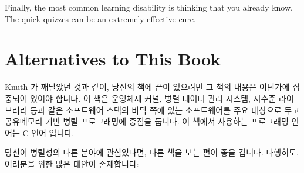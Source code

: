 Finally, the most common learning disability is thinking that
you already know.
The quick quizzes can be an extremely effective cure.
\fi

\section{Alternatives to This Book}
\label{sec:Alternatives to This Book}

Knuth 가 깨달았던 것과 같이, 당신의 책에 끝이 있으려면 그 책의 내용은 어딘가에
집중되어 있어야 합니다.
이 책은 운영체제 커널, 병렬 데이터 관리 시스템, 저수준 라이브러리 등과 같은
소프트웨어 스택의 바닥 쪽에 있는 소프트웨어를 주요 대상으로 두고 공유메모리
기반 병렬 프로그래밍에 중점을 둡니다.
이 책에서 사용하는 프로그래밍 언어는 C 언어 입니다.
\iffalse

As Knuth learned, if you want your book to be finite, it must be focused.
This book focuses on shared-memory parallel programming, with an
emphasis on software that lives near the bottom of the software stack,
such as operating-system kernels, parallel data-management systems,
low-level libraries, and the like.
The programming language used by this book is C.
\fi

당신이 병렬성의 다른 분야에 관심있다면, 다른 책을 보는 편이 좋을 겁니다.
다행히도, 여러분을 위한 많은 대안이 존재합니다:
\iffalse

If you are interested in other aspects of parallelism, you might well
be better served by some other book.
Fortunately, there are many alternatives available to you:
\fi

